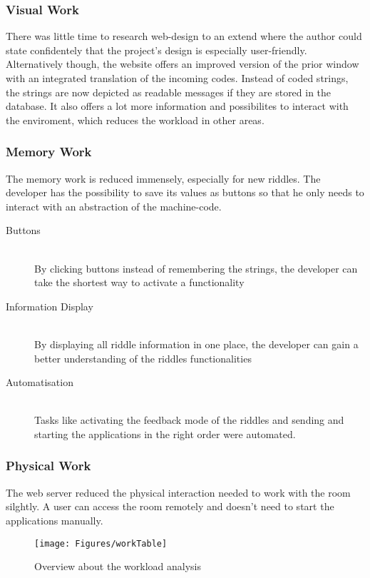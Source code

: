 \subsubsection{Visual Work}
There was little time to research web-design to an extend where the author could state confidentely that the project's design is especially user-friendly.
Alternatively though, the website offers an improved version of the prior window with an integrated translation of the incoming codes.
Instead of coded strings, the strings are now depicted as readable messages if they are stored in the database.
It also offers a lot more information and possibilites to interact with the enviroment, which reduces the workload in other areas.
\subsubsection{Memory Work}
The memory work is reduced immensely, especially for new riddles. 
The developer has the possibility to save its values as buttons so that he only needs to interact with an abstraction of the machine-code.
\begin{description}
    \item [Buttons] \hfill \\
    By clicking buttons instead of remembering the strings, the developer can take the shortest way to activate a functionality
    \item [Information Display] \hfill \\
    By displaying all riddle information in one place, the developer can gain a better understanding of the riddles functionalities
    \item [Automatisation] \hfill \\
    Tasks like activating the feedback mode of the riddles and sending 
    and starting the applications in the right order were automated.
\end{description}
\subsubsection{Physical Work}
The web server reduced the physical interaction needed to work with the room  silghtly. 
A user can access the room remotely and doesn't need to start the applications manually.

\begin{figure}[th]
	\centering
	\texttt{[image: Figures/workTable]}
	\decoRule
	\caption[Workload Overview]{Overview about the workload analysis}
	\label{fig:TableWork}
\end{figure}

